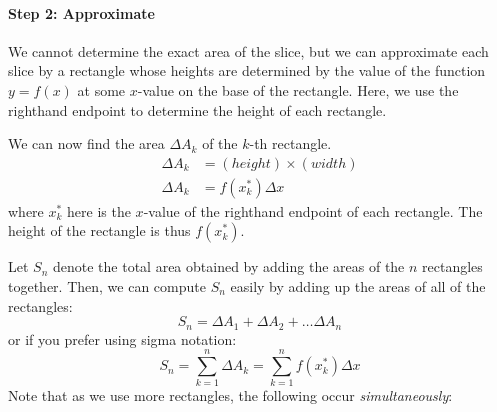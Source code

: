 \documentclass{ximera}
\begin{document}
\paragraph{Step 2: Approximate}

We cannot determine the exact area of the slice, but we can approximate each slice by a rectangle whose heights are determined by the value of the function $y = f(x)$ at some $x$-value on the base of the rectangle.  Here, we use the righthand endpoint to determine the height of each rectangle.

\begin{image}
\end{image}

We can now find the area $\Delta A_k$ of the $k$-th rectangle. 
\begin{align}
\Delta A_k & = (height) \times (width) \nonumber \\
\Delta A_k &= f\left(x_k^*\right)\Delta x 
\end{align}
where $x_k^*$ here is the $x$-value of the righthand endpoint of each rectangle.  The height of the rectangle is thus $f(x_k^*)$. 

Let $S_n$ denote the total area obtained by adding the areas of the $n$ rectangles together.   Then, we can compute $S_n$ easily by adding up the areas of all of the rectangles: $$S_n = \Delta A_1 + \Delta A_2 + \ldots \Delta A_n$$
or if you prefer using sigma notation: 
\begin{equation}
S_n =\sum_{k=1}^{n} \Delta A_k =  \sum_{k=1}^n f(x_k^*) \Delta x 
\end{equation}
Note that as we use more rectangles, the following occur \emph{simultaneously}:
\end{document}
